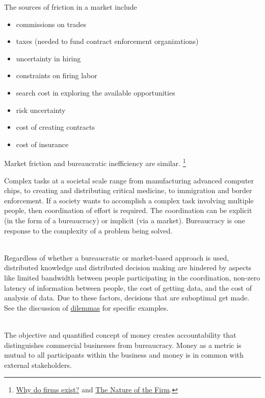The sources of friction in a market include
\begin{itemize}
    \item commissions on trades
    \item taxes (needed to fund contract enforcement organizations)
    \item uncertainty in hiring
    \item constraints on firing labor
    \item search cost in exploring the available opportunities
    \item risk uncertainty
    \item cost of creating contracts
    \item cost of insurance
\end{itemize}
Market friction and bureaucratic inefficiency are similar. \footnote{  \href{http://www.economist.com/node/17730360}{Why do firms exist?} and \href{https://en.wikipedia.org/wiki/The_Nature_of_the_Firm}{The Nature of the Firm}.}

Complex tasks at a societal scale range from manufacturing advanced computer chips, to creating and distributing critical medicine, to immigration and border enforcement. 
If a society wants to accomplish a complex task involving multiple people, then coordination of effort is required. The coordination can be explicit (in the form of a bureaucracy) or implicit (via a market).  Bureaucracy is one response to the complexity of a problem being solved.


\ \\

Regardless of whether a bureaucratic or market-based approach is used, 
distributed knowledge and distributed decision making are hindered by aspects like
limited bandwidth between people participating in the coordination,
non-zero latency of information between people,
the cost of getting data,
and
the cost of analysis of data.
Due to these factors, decisions that are suboptimal get made. See  %
the discussion of 
\hyperref[sec:dilemma-trilemma]{dilemmas}
for specific examples.

\ \\

The objective and quantified concept of money creates accountability that distinguishes commercial businesses from bureaucracy. Money as a metric is mutual to all participants within the business and money is in common with external stakeholders. 

